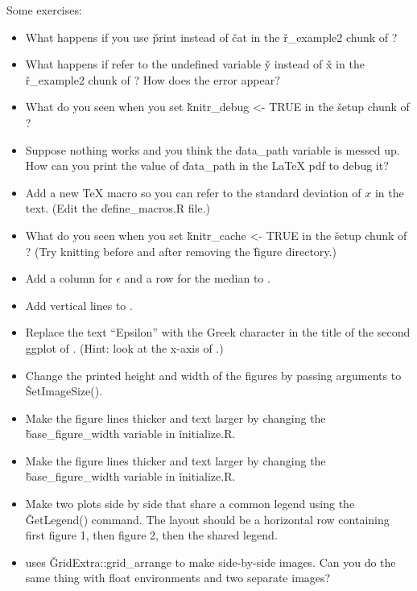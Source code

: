 
Some exercises:

\begin{itemize}
%
    \item What happens if you use \v{print} instead of \v{cat} in the
    \v{r\_example2} chunk of ?

    \item What happens if refer to the undefined variable \v{y} instead of \v{x}
    in the \v{r\_example2} chunk of ?  How does the
    error appear?

    \item What do you seen when you set \v{knitr\_debug <- TRUE} in the
    \v{setup} chunk of ?

    \item Suppose nothing works and you think the \v{data\_path} variable is
    messed up.  How can you print the value of \v{data\_path} in the LaTeX pdf
    to debug it?

    \item Add a new TeX macro so you can refer to the standard deviation of $x$
    in the text.  (Edit the \v{define\_macros.R} file.)

    \item What do you seen when you set \v{knitr\_cache <- TRUE} in the
    \v{setup} chunk of ?  (Try knitting before and after
    removing the \v{figure} directory.)

    \item Add a column for $\epsilon$ and a row for the median to
    .

    \item Add vertical lines to .

    \item Replace the text ``Epsilon'' with the Greek character in the title
    of the second ggplot of .  (Hint: look at the
    x-axis of .)

    \item Change the printed height and width of the figures by passing
    arguments to \v{SetImageSize()}.

    \item Make the figure lines thicker and text larger by changing the
    \v{base\_figure\_width} variable in \v{initialize.R}.

    \item Make the figure lines thicker and text larger by changing the
    \v{base\_figure\_width} variable in \v{initialize.R}.

    \item Make two plots side by side that share a common legend using the
    \v{GetLegend()} command.  The layout should be a horizontal row containing
    first figure 1, then figure 2, then the shared legend.

    \item  {} uses \v{GridExtra::grid\_arrange} to make
    side-by-side images.  Can you do the same thing with float environments and
    two separate images?

\end{itemize}
